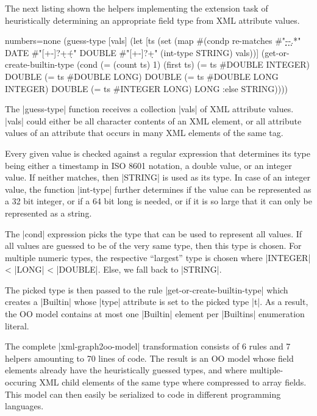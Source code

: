 \documentclass[submission]{eptcs}
\newcommand{\code}{\clojureinline}
\begin{document}
The next listing shown the helpers implementing the extension task of
heuristically determining an appropriate field type from XML attribute values.

\begin{clojurecode*}{numbers=none}
  (guess-type [vals]
   (let [ts (set (map #(condp re-matches %
                         #"\d\d\d\d-\d\d-\d\d.*" DATE
                         #"[+-]?\d+\.\d+"        DOUBLE
                         #"[+-]?\d+"             (int-type %
                         STRING) vals))]
     (get-or-create-builtin-type
      (cond
       (= (count ts) 1)              (first ts)
       (= ts #{DOUBLE INTEGER})      DOUBLE
       (= ts #{DOUBLE LONG})         DOUBLE
       (= ts #{DOUBLE LONG INTEGER}) DOUBLE
       (= ts #{INTEGER LONG})        LONG
       :else                         STRING))))
\end{clojurecode*}

The \code|guess-type| function receives a collection \code|vals| of XML
attribute values.  \code|vals| could either be all character contents of an XML
element, or all attribute values of an attribute that occurs in many XML
elements of the same tag.

Every given value is checked against a regular expression that determines its
type being either a timestamp in ISO 8601 notation, a double value, or an
integer value.  If neither matches, then \code|STRING| is used as its type.  In
case of an integer value, the function \code|int-type| further determines if
the value can be represented as a 32 bit integer, or if a 64 bit long is
needed, or if it is so large that it can only be represented as a string.

The \code|cond| expression picks the type that can be used to represent all
values.  If all values are guessed to be of the very same type, then this type
is chosen.  For multiple numeric types, the respective ``largest'' type is
chosen where \code|INTEGER| < \code|LONG| < \code|DOUBLE|.  Else, we fall back
to \code|STRING|.

The picked type is then passed to the rule \code|get-or-create-builtin-type|
which creates a \code|Builtin| whose \code|type| attribute is set to the picked
type \code|t|.  As a result, the OO model contains at most one \code|Builtin|
element per \code|Builtins| enumeration literal.

The complete \code|xml-graph2oo-model| transformation consists of 6 rules and 7
helpers amounting to 70 lines of code.  The result is an OO model whose field
elements already have the heuristically guessed types, and where
multiple-occuring XML child elements of the same type where compressed to array
fields.  This model can then easily be serialized to code in different
programming languages.
\end{document}
